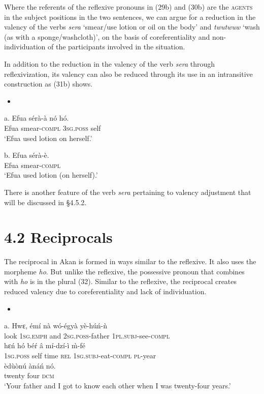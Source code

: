 \documentclass[output=paper]{langsci/langscibook}
\begin{document}
Where the referents of the reflexive pronouns in (29b) and (30b) are the \textsc{agents} in the subject positions in the two sentences, we can argue for a reduction in the valency of the verbs \emph{sera} ‘smear/use lotion or oil on the body’ and \emph{twutwuw} ‘wash (as with a sponge/washcloth)’, on the basis of coreferentiality and non-individuation of the participants involved in the situation. 

In addition to the reduction in the valency of the verb \emph{sera} through reflexivization, its valency can also be reduced through its use in an intransitive construction as (31b) shows.

\begin{itemize}
\item \end{itemize}
\gll a.  Efua  s\'{e}r\`{a}-\`{a}    n\'{o}    h\'{o}.\\
       Efua  smear-\textsc{compl}  \textsc{3sg.poss}  self\\
\glt   ‘Efua used lotion on herself.’
\z

\gll  b.  Efua  s\'{e}r\`{a}-\`{e}.\\
       Efua  smear-\textsc{compl}\\
\glt   ‘Efua used lotion (on herself).’
\z

There is another feature of the verb \emph{sera} pertaining to valency adjustment that will be discussed in §4.5.2.

\section{4.2  Reciprocals}

The reciprocal in Akan is formed in ways similar to the reflexive. It also uses the morpheme \emph{ho}. But unlike the reflexive, the possessive pronoun that combines with \emph{ho} is in the plural (32). Similar to the reflexive, the reciprocal creates reduced valency due to coreferentiality and lack of individuation.

\begin{itemize}
\item \end{itemize}
\gll a.  Hwɛ,  \'{e}m\'{i}     n\`{a}   w\'{o}-\'{e}gy\`{a}     y\`{e}-h\'{u}\'{n}-\`{n}       \\
       look  \textsc{1sg.emph}  and  \textsc{2sg.poss}{}-father  \textsc{1pl.subj}{}-see-\textsc{compl}  \\
\gll   hɛ\'{n}    h\'{o}   b\'{e}\'{r}   â  m\'{i}-dz\'{i}-\`{i}     \`{m}-f\'{e}  \\
       \textsc{1sg.poss}  self  time  \textsc{rel}  \textsc{1sg.subj}{}-eat-\textsc{compl}  \textsc{pl}{}-year\\
\gll   \`{e}d\`{u}\`{o}n\'{u}   \`{a}n\'{a}\'{n}     n\'{o}.     \\
       twenty    four    \textsc{dcm}\\
\glt ‘Your father and I got to know each other when I was twenty-four years.’ \citep[9]{Martin1936}
\z
\end{document}
